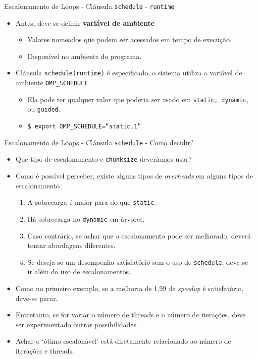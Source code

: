 	\begin{frame}{Escalonamento de Loops - Cláusula {\tt schedule} - {\tt runtime}}
		\begin{itemize}
			\setlength\itemsep{1.5em}
			\item Antes, deve-se definir {\bf variável de ambiente} 
			\begin{itemize}
				\setlength\itemsep{0.8em}
				\item Valores nomeados que podem ser acessados em tempo de execução. 
				\item Disponível no ambiente do programa.
			\end{itemize}
			\item Cláusula {\tt schedule(runtime)} é especificado, o sistema utiliza a variável de ambiente {\tt OMP\_SCHEDULE}.
			\begin{itemize}
				\setlength\itemsep{0.8em}
				\item Ela pode ter qualquer valor que poderia ser usado em {\tt static, dynamic}, ou {\tt guided}.
				\item {\tt \$ export OMP\_SCHEDULE=``static,1''}
			\end{itemize}
		\end{itemize}
	\end{frame}

	\begin{frame}{Escalonamento de Loops - Cláusula {\tt schedule} - Como decidir?}
		\begin{itemize}
			\item Que tipo de escalonamento e {\tt chunksize} deveríamos usar?
					\bigskip
			\item Como é possível perceber, existe alguns tipos de {\it overheads} em alguns tipos de escalonamento
			\begin{enumerate}
				\item A sobrecarga é maior para  do que {\tt static}.
				\item Há sobrecarga no {\tt dynamic} em árvores.
				\item Caso contrário, se achar que o escalonamento pode ser melhorado, deverá tentar abordagens diferentes.
				\item Se deseja-se um desempenho satisfatório sem o uso de {\tt schedule}, deve-se ir além do uso de escalonamentos.
			\end{enumerate}
						\bigskip
			\item Como no primeiro exemplo, se a melhoria de 1,99 de \textit{speedup} é satisfatório, deve-se parar.
			\item Entretanto, se for variar o número de threads e o número de iterações, deve ser experimentado outras possibilidades. 
			\item Achar o `ótimo escalonável' está diretamente relacionado ao número de iterações e threads.
		\end{itemize}
	\end{frame}

